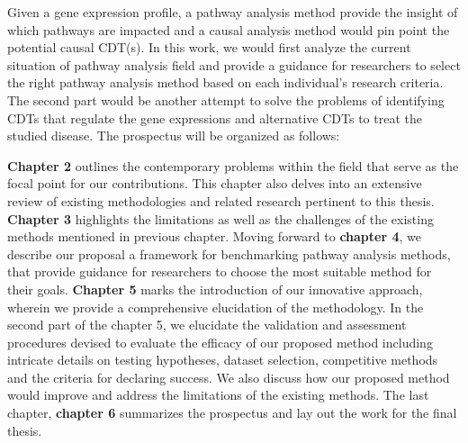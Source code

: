 %

Given a gene expression profile, a pathway analysis method provide the insight of which pathways are impacted and a causal analysis method would pin point the potential causal CDT(s).
In this work, we would first analyze the current situation of pathway analysis field and provide a guidance for  researchers to select the right pathway analysis method based on each individual's research criteria. The second part would be another attempt to solve the problems of identifying CDTs that regulate the gene expressions and alternative CDTs to treat the studied disease. The prospectus will be organized as follows:

\textbf{Chapter 2}  outlines the contemporary problems within the field that serve as the focal point for our contributions. This chapter also delves into an extensive review of existing methodologies and related research pertinent to this thesis.
\textbf{Chapter 3} highlights the limitations as well as the challenges of the existing methods mentioned in previous chapter.
Moving forward to \textbf{chapter 4}, we describe our proposal a framework for benchmarking pathway analysis methods, that provide guidance for researchers to choose the most suitable method for their goals. \textbf{Chapter 5} marks the introduction of our innovative approach, wherein we provide a comprehensive elucidation of the methodology. In the second part of the chapter 5, we elucidate the validation and assessment procedures devised to evaluate the efficacy of our proposed method including intricate details on testing hypotheses, dataset selection, competitive methods and the criteria for declaring success. We also discuss how our proposed method would improve and address the limitations of the existing methods.
The last chapter, \textbf{chapter 6} summarizes the prospectus and lay out the work for the final thesis.


